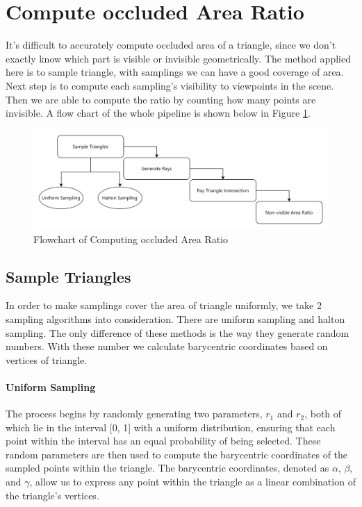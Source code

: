 \documentclass[11pt, a4paper,oneside,chapterprefix=false]{scrbook}
\begin{document}
\section{Compute occluded Area Ratio} \label{sec:compute occluded area ratio}

It's difficult to accurately compute occluded area of a triangle, since we don't exactly know which part is visible or invisible geometrically. The method applied here is to sample triangle, with samplings we can have a good coverage of area. Next step is to compute each sampling's visibility to viewpoints in the scene. Then we are able to compute the ratio by counting how many points are invisible. A flow chart of the whole pipeline is shown below in Figure \ref{fig:flowchart of computing occluded area ratio}.

\begin{figure}[H]
    \centering
    \includegraphics*[width=1.0\textwidth]{figures/Compute occluded Area Ratio.png}
    \caption{Flowchart of Computing occluded Area Ratio}
    \label{fig:flowchart of computing occluded area ratio}
\end{figure}

\subsection{Sample Triangles} \label{subsec:sample triangle}

In order to make samplings cover the area of triangle uniformly, we take 2 sampling algorithms into consideration. There are uniform sampling and halton sampling. The only difference of these methods is the way they generate random numbers. With these number we calculate barycentric coordinates based on vertices of triangle. 

\paragraph{Uniform Sampling}

The process begins by randomly generating two parameters, \( r_1 \) and \( r_2 \), both of which lie in the interval [0, 1] with a uniform distribution, ensuring that each point within the interval has an equal probability of being selected. These random parameters are then used to compute the barycentric coordinates of the sampled points within the triangle. The barycentric coordinates, denoted as \( \alpha \), \( \beta \), and \( \gamma \), allow us to express any point within the triangle as a linear combination of the triangle's vertices.
\end{document}
